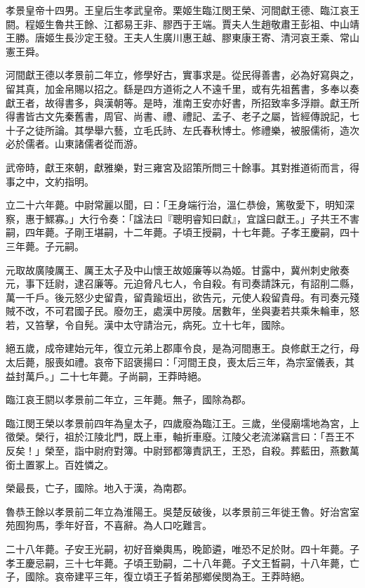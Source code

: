 
\begin{pinyinscope}
孝景皇帝十四男。王皇后生孝武皇帝。栗姬生臨江閔王榮、河間獻王德、臨江哀王閼。程姬生魯共王餘、江都易王非、膠西于王端。賈夫人生趙敬肅王彭祖、中山靖王勝。唐姬生長沙定王發。王夫人生廣川惠王越、膠東康王寄、清河哀王乘、常山憲王舜。

河間獻王德以孝景前二年立，修學好古，實事求是。從民得善書，必為好寫與之，留其真，加金帛賜以招之。繇是四方道術之人不遠千里，或有先祖舊書，多奉以奏獻王者，故得書多，與漢朝等。是時，淮南王安亦好書，所招致率多浮辯。獻王所得書皆古文先秦舊書，周官、尚書、禮、禮記、孟子、老子之屬，皆經傳說記，七十子之徒所論。其學舉六藝，立毛氏詩、左氏春秋博士。修禮樂，被服儒術，造次必於儒者。山東諸儒者從而游。

武帝時，獻王來朝，獻雅樂，對三雍宮及詔策所問三十餘事。其對推道術而言，得事之中，文約指明。

立二十六年薨。中尉常麗以聞，曰：「王身端行治，溫仁恭儉，篤敬愛下，明知深察，惠于鰥寡。」大行令奏：「諡法曰『聰明睿知曰獻』，宜諡曰獻王。」子共王不害嗣，四年薨。子剛王堪嗣，十二年薨。子頃王授嗣，十七年薨。子孝王慶嗣，四十三年薨。子元嗣。

元取故廣陵厲王、厲王太子及中山懷王故姬廉等以為姬。甘露中，冀州刺史敞奏元，事下廷尉，逮召廉等。元迫脅凡七人，令自殺。有司奏請誅元，有詔削二縣，萬一千戶。後元怒少史留貴，留貴踰垣出，欲告元，元使人殺留貴母。有司奏元殘賊不改，不可君國子民。廢勿王，處漢中房陵。居數年，坐與妻若共乘朱輪車，怒若，又笞擊，令自髡。漢中太守請治元，病死。立十七年，國除。

絕五歲，成帝建始元年，復立元弟上郡庫令良，是為河間惠王。良修獻王之行，母太后薨，服喪如禮。哀帝下詔褒揚曰：「河間王良，喪太后三年，為宗室儀表，其益封萬戶。」二十七年薨。子尚嗣，王莽時絕。

臨江哀王閼以孝景前二年立，三年薨。無子，國除為郡。

臨江閔王榮以孝景前四年為皇太子，四歲廢為臨江王。三歲，坐侵廟壖地為宮，上徵榮。榮行，祖於江陵北門，既上車，軸折車廢。江陵父老流涕竊言曰：「吾王不反矣！」榮至，詣中尉府對簿。中尉郅都簿責訊王，王恐，自殺。葬藍田，燕數萬銜土置冢上。百姓憐之。

榮最長，亡子，國除。地入于漢，為南郡。

魯恭王餘以孝景前二年立為淮陽王。吳楚反破後，以孝景前三年徙王魯。好治宮室苑囿狗馬，季年好音，不喜辭。為人口吃難言。

二十八年薨。子安王光嗣，初好音樂輿馬，晚節遴，唯恐不足於財。四十年薨。子孝王慶忌嗣，三十七年薨。子頃王勁嗣，二十八年薨。子文王晳嗣，十八年薨，亡子，國除。哀帝建平三年，復立頃王子晳弟郚鄉侯閔為王。王莽時絕。


\end{pinyinscope}
